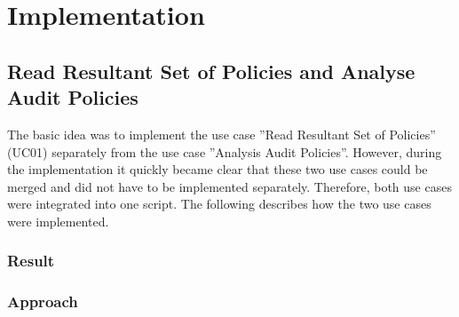 \section{Implementation}

\subsection{Read Resultant Set of Policies and Analyse Audit Policies}
The basic idea was to implement the use case ''Read Resultant Set of Policies'' (UC01) separately from the use case ''Analysis Audit Policies''. However, during the implementation it quickly became clear that these two use cases could be merged and did not have to be implemented separately. Therefore, both use cases were integrated into one script. The following describes how the two use cases were implemented.

\subsubsection{Result}

\subsubsection{Approach}
